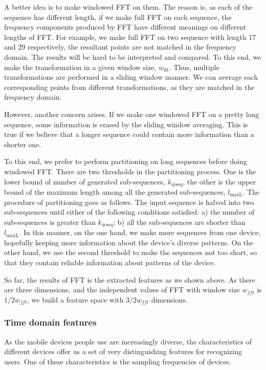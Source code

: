 \documentclass{article} %
\begin{document}
A better idea is to make windowed FFT on them. The reason is, as each of the sequence has different length, if we make full FFT on each sequence, the frequency components produced by FFT have different meanings on different lengths of FFT. For example, we make full FFT on two sequence with length 17 and 29 respectively, the resultant points are not matched in the frequency domain. The results will be hard to be interpreted and compared. To this end, we make the transformation in a given window size, $w_\mathrm{fft}$. Thus, multiple transformations are performed in a sliding window manner. We can average each corresponding points from different transformations, as they are matched in the frequency domain. 

However, another concern arises. If we make one windowed FFT on a pretty long sequence, some information is erased by the sliding window averaging. This is true if we believe that a longer sequence could contain more information than a shorter one.

To this end, we prefer to perform partitioning on long sequences before doing windowed FFT. There are two thresholds in the partitioning process. One is the lower bound of number of generated sub-sequences, $k_\mathrm{\#seq}$, the other is the upper bound of the maximum length among all the generated sub-sequences, $l_\mathrm{maxL}$. The procedure of partitioning goes as follows. The input sequence is halved into two sub-sequences until either of the following conditions satisfied: a) the number of sub-sequences is greater than $k_\mathrm{\#seq}$; b) all the sub-sequences are shorter than $l_\mathrm{maxL}$. In this manner, on the one hand, we make more sequences from one device, hopefully keeping more information about the device's diverse patterns. On the other hand, we use the second threshold to make the sequences not too short, so that they contain reliable information about patterns of the device.

So far, the results of FFT is the extracted features as we shown above. As there are three dimensions, and the independent values of FFT with window size $w_{fft}$ is $1/2w_{fft}$, we build a feature space with $3/2w_{fft}$ dimensions.

\subsubsection{Time domain features}
As the mobile devices people use are increasingly diverse, the characteristics of different devices offer us a set of very distinguishing features for recognizing users. One of these characteristics is the sampling frequencies of devices.
\end{document}
